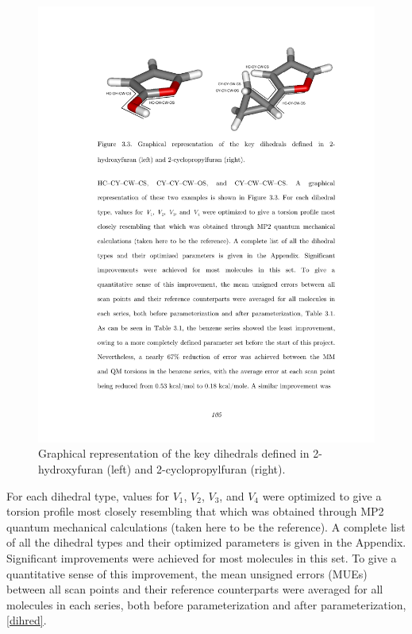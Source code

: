 \documentclass[12pt]{report}
\begin{document}
\begin{figure}[ht]
\centering
\includegraphics[scale=0.999]{figures/pdf/dihex2.pdf}
\caption{Graphical representation of the key dihedrals defined in 2-hydroxyfuran (left) and 2-cyclopropylfuran (right).}
\label{dihex2}
\end{figure}

For each dihedral type, values for $V_1$, $V_2$, $V_3$, and $V_4$ were optimized to give a torsion profile most closely resembling that which was obtained through MP2 quantum mechanical calculations (taken here to be the reference). A complete list of all the dihedral types and their optimized parameters is given in the Appendix. Significant improvements were achieved for most molecules in this set. To give a quantitative sense of this improvement, the mean unsigned errors (MUEs) between all scan points and their reference counterparts were averaged for all molecules in each series, both before parameterization and after parameterization, \cref{dihred}. 
\end{document}
